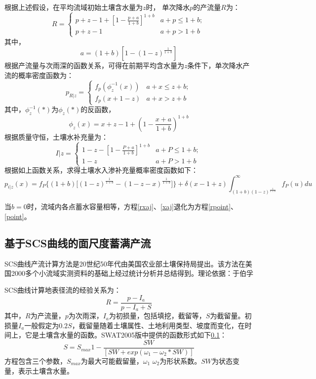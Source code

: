 根据上述假设，在平均流域初始土壤含水量为$z$时，
\fi
单次降水$p$的产流量$R$为：
\begin{equation}
R=
 \begin{cases}
 p+z-1+[1-\frac{p+a}{1+b}]^{1+b}&{a+p\leq 1+b};\\p+z-1 &{a+p> 1+b}
 \end{cases}
\end{equation}
其中，
\begin{equation}
a=(1+b)[1-(1-z)^{\frac{1}{1+b}}]
\end{equation}
根据产流量与次雨深的函数关系，可得在前期平均含水量为$z$条件下，单次降水产流的概率密度函数为：
\begin{equation}
\label{rxaj}
p_{R|z}=
 \begin{cases}
 f_p(\phi_z^{-1}(x))&{a+x \leq z+b};\\f_p(x+1-z) &{a+x> z+b}
 \end{cases}
\end{equation}
其中，$\phi_z^{-1}(*)$为$\phi_z(*)$的反函数，
\begin{equation}
\phi_z(x)=x+z-1+(1-\frac{x+a}{1+b})^{1+b}
\end{equation}
根据质量守恒，土壤水补充量为：
\begin{equation}
I\vert z=
 \begin{cases}
 1-z-[1-\frac{P+a}{1+b}]^{1+b}&{a+P\leq 1+b};\\1-z &{a+P> 1+b}
 \end{cases}
\end{equation}
根据如上函数关系，求得土壤水入渗补充量概率密度函数如下：
\begin{equation}
\label{xaj}
p_{i|z}(x)=f_P\bigg \{(1+b)\big [(1-z)^{\frac{1}{1+b}}-(1-z-x)^{\frac{1}{1+b}}\big ]\bigg \}+\delta(x-1+z)\int_{(1+b)(1-z)^{\frac{1}{1+b}}}^{\infty} f_P(u) du 
\end{equation}

当$b=0$时，流域内各点蓄水容量相等，方程\ref{rxaj}、\ref{xaj}退化为方程\ref{rpoint}、\ref{point}。
 


\iffalse
\subsection{基于SCS曲线的面尺度蓄满产流}
SCS曲线产流计算方法是20世纪50年代由美国农业部土壤保持局提出\cite{}。该方法在美国2000多个小流域实测资料的基础上经过统计分析并总结得到。理论依据：于伯孚\cite{}

SCS曲线计算地表径流的经验关系为：
\begin{equation}
\label{SCS}
R=\frac{p-I_a}{p-I_a+S}
\end{equation}
其中，$R$为产流量，$p$为次雨深，$I_a$为初损量，包括填挖，截留等，$S$为截留量。初损量$I_a$一般假定为$0.2S$，截留量随着土壤属性、土地利用类型、坡度而变化，在时间上，它是土壤含水量的函数。SWAT2005版中提供的函数形式如下\ref{}：
\begin{equation}
S=S_{max}{1-\frac{SW}{[SW+exp(\omega _1-\omega _2*SW)]}}
\end{equation}
方程包含三个参数，$S_{max}$为最大可能截留量，$\omega _1$ $\omega _2$为形状系数。$SW$为状态变量，表示土壤含水量。


